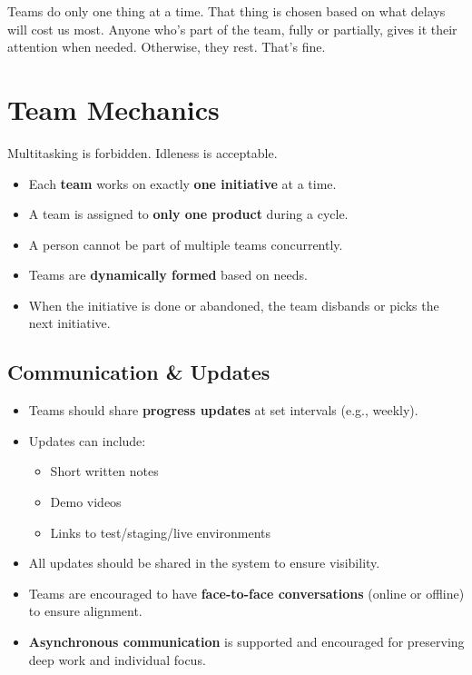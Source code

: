 \documentclass[a4paper]{article}
\begin{document}
Teams do only one thing at a time. That thing is chosen based on what delays will cost us most. Anyone who’s part of the team, fully or partially, gives it their attention when needed. Otherwise, they rest. That’s fine.

\section{Team Mechanics}

Multitasking is forbidden. Idleness is acceptable.

\begin{itemize}
    \item Each \textbf{team} works on exactly \textbf{one initiative} at a time.
    \item A team is assigned to \textbf{only one product} during a cycle.
    \item A person cannot be part of multiple teams concurrently.
    \item Teams are \textbf{dynamically formed} based on needs.
    \item When the initiative is done or abandoned, the team disbands or picks the next initiative.
\end{itemize}

\subsection*{Communication \& Updates}

\begin{itemize}
    \item Teams should share \textbf{progress updates} at set intervals (e.g., weekly).
    \item Updates can include:
    \begin{itemize}
        \item Short written notes
        \item Demo videos
        \item Links to test/staging/live environments
    \end{itemize}
    \item All updates should be shared in the system to ensure visibility.
    \item Teams are encouraged to have \textbf{face-to-face conversations} (online or offline) to ensure alignment.
    \item \textbf{Asynchronous communication} is supported and encouraged for preserving deep work and
individual focus.
\end{itemize}
\end{document}
